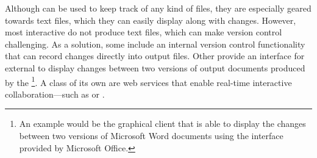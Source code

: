 \begin{figure}
  
\end{figure}

\begin{figure}
  
\end{figure}

%  

Although  can be used to keep track of any kind of files, they are
especially geared towards text files, which they can easily display along with
changes. However, most interactive  do not produce text files, which
can make version control challenging. As a solution, some  include
an internal version control functionality that can record changes directly into
output files. Other  provide an interface for external 
to display changes between two versions of output documents produced by the
\footnote{
  An example would be the graphical  client  that is able to display the changes between two versions
  of Microsoft Word documents using the interface provided by Microsoft Office.
}. A class of its own are web services that enable real-time interactive
collaboration---such as  or .

